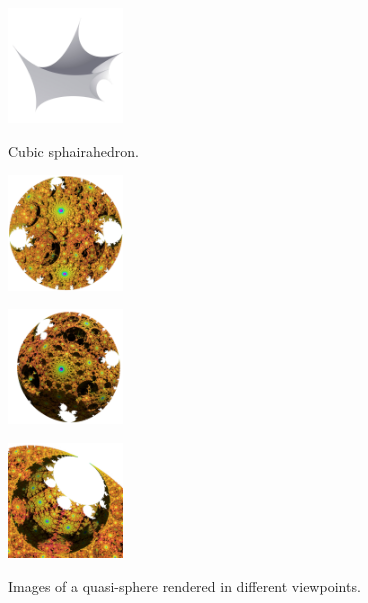 \documentclass[suppldata, dvipdfmx]{interact}
\theoremstyle{plain}%
\theoremstyle{definition}
\theoremstyle{remark}
\theoremstyle{problemstyle}
\begin{document}
\begin{figure}[h!tbp]
  \begin{minipage}[t]{0.25\textwidth}
   \centering
   \includegraphics[height=1.2in, keepaspectratio]{./img/introduction/cube.jpg}
   \caption{Cubic sphairahedron.}
   \label{fig:cubeSphaira}
  \end{minipage}
  \hspace*{\fill}
 \begin{minipage}[t]{0.75\textwidth}
  \begin{minipage}[t]{0.25\textwidth}
   \centering
   \includegraphics[height=1.2in,
   keepaspectratio]{./img/introduction/quasi-sphere1.jpg}
   \subcaption{}
   \label{fig:quasi-sphere1}
  \end{minipage}
  \hspace*{\fill}
  \begin{minipage}[t]{0.25\textwidth}
   \centering
   \includegraphics[height=1.2in,
   keepaspectratio]{./img/introduction/quasi-sphere2.jpg}
   \subcaption{}
   \label{fig:quasi-sphere2}
  \end{minipage}
  \hspace*{\fill}
  \begin{minipage}[t]{0.25\textwidth}
   \centering
   \includegraphics[height=1.2in,
   keepaspectratio]{./img/introduction/quasi-sphere-zoom.jpg}
   \subcaption{}
   \label{fig:quasi-sphereZoom}
  \end{minipage}
  \hspace*{\fill}
  \caption{Images of a quasi-sphere rendered in different viewpoints.}
  \label{fig:quasi-sphere}
 \end{minipage}
\end{figure}
\end{document}
